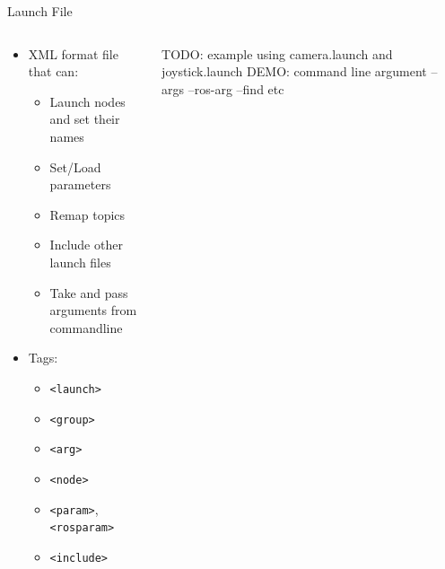 \documentclass[aspectratio=43]{beamer}
\newcommand{\inline}[1]{\texttt{#1}}
\begin{document}
\begin{frame}{Launch File}
	\begin{columns}
		\begin{column}{0.6\textwidth}
			\begin{itemize}
				\item XML format file that can:
					\begin{itemize}
						\item Launch nodes and set their names
						\item Set/Load parameters
						\item Remap topics
						\item Include other launch files
						\item Take and pass arguments from commandline
					\end{itemize}
				\item Tags:
					\begin{itemize}
						\item \inline{<launch>}
						\item \inline{<group>}
						\item \inline{<arg>}
						\item \inline{<node>}
						\item \inline{<param>},\inline{<rosparam>}
						\item \inline{<include>}
					\end{itemize}
			\end{itemize}
		\end{column}
	\begin{column}{0.4\textwidth}
		\centering
		TODO: example using camera.launch and joystick.launch
		DEMO: command line argument --args --ros-arg --find etc
		\end{column}
	\end{columns}
\end{frame}
\end{document}
